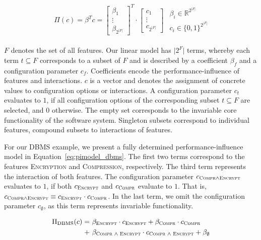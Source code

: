 \documentclass[sigconf, screen]{acmart}
\begin{document}
	\begin{align} \label{eq:pimodel}
	\begin{split}
	\Pi(c) = \beta^T c =  \begin{bmatrix}
	\beta_1\\
	\vdots \\
	\beta_{2^{\vert F\vert}}
	\end{bmatrix}^T \cdot \begin{bmatrix}
	c_1\\
	\vdots \\
	c_{2^{\vert F\vert}}
	\end{bmatrix}
	\end{split}
	\begin{split}
	\beta_i \in \mathbb{R}^{2^{|F|}}\\
	c_i \in \lbrace 0,1\rbrace^{2^{|F|}}
	\end{split}
	\end{align}
	
	$F$ denotes the set of all features. Our linear model has $\vert 2^F\vert$ terms, whereby each term $t \subseteq F$ corresponds to a subset of $F$ and is described by a coefficient $\beta_f$ and a configuration parameter $c_f$.
	Coefficients encode the performance-influence of features and interactions. $c$ is a vector and denotes the assignment of concrete values to configuration options or interactions. A configuration parameter $c_t$ evaluates to $1$, if all configuration options of the corresponding subset $t \subseteq F$ are selected, and $0$ otherwise. The empty set corresponds to the invariable core functionality of the software system. Singleton subsets correspond to individual features, compound subsets to interactions of features.
	
	For our DBMS example, we present a fully determined performance-influence model in Equation~\ref{eq:pimodel_dbms}. The first two terms correspond to the features \textsc{Encryption} and \textsc{Compression}, respectively. The third term represents the interaction of both features. The configuration parameter $c_{\textsc{Compr}\land\textsc{Encrypt}}$ evaluates to $1$, if both $c_{\textsc{Encrypt}}$ and $c_{\textsc{Compr}}$ evaluate to $1$.
	That is, $c_{\textsc{Compr}\land\textsc{Encrypt}} \equiv c_{\textsc{Encrypt}} \cdot c_{\textsc{Compr}}$. In the last term, we omit the configuration parameter $c_\emptyset$, as this term represents invariable functionality.
	
	\begin{align} \label{eq:pimodel_dbms}
	\begin{split}
	\Pi_{\text{DBMS}}(c) =&~\beta_{\textsc{Encrypt}} \cdot c_{\textsc{Encrypt}} + \beta_{\textsc{Compr}} \cdot c_{\textsc{Compr}} \\
	+&~ \beta_{\textsc{Compr\ $\land$\ Encrypt}} \cdot c_{\textsc{Compr\ $\land$\ Encrypt}}
	+ \beta_{\emptyset}
	\end{split}
	\end{align}
	
\end{document}
